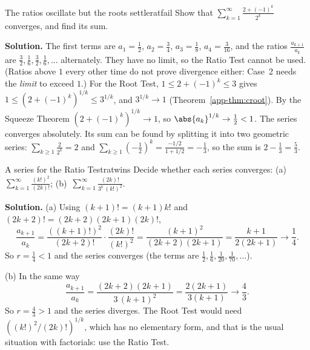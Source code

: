 \documentclass[11pt]{article}
\begin{document}
\begin{exmp}{The ratios oscillate but the roots settle}{ratfail}
Show that $\displaystyle\sum_{k=1}^\infty\frac{2+(-1)^k}{2^k}$ converges, and find its sum.

\textbf{Solution.} The first terms are $a_1=\frac12$, $a_2=\frac34$, $a_3=\frac18$, $a_4=\frac3{16}$, and the ratios $\frac{a_{k+1}}{a_k}$ are $\frac32,\frac16,\frac32,\frac16,\dots$ alternately. They have no limit, so the Ratio Test cannot be used. (Ratios above $1$ every other time do not prove divergence either: Case~2 needs the \emph{limit} to exceed $1$.)
For the Root Test, $1\le2+(-1)^k\le3$ gives $1\le\left(2+(-1)^k\right)^{1/k}\le3^{1/k}$, and $3^{1/k}\to1$ (Theorem~\ref{app-thm:croot}). By the Squeeze Theorem $\left(2+(-1)^k\right)^{1/k}\to1$, so $\abs{a_k}^{1/k}\to\frac12<1$. The series converges absolutely. Its sum can be found by splitting it into two geometric series: $\sum_{k\ge1}\frac2{2^k}=2$ and $\sum_{k\ge1}\left(-\frac12\right)^k=\frac{-1/2}{1+1/2}=-\frac13$, so the sum is $2-\frac13=\frac53$.
\end{exmp}

\begin{exmp}{A series for the Ratio Test}{ratwins}
Decide whether each series converges: (a)~$\displaystyle\sum_{k=1}^\infty\frac{(k!)^2}{(2k)!}$; \quad (b)~$\displaystyle\sum_{k=1}^\infty\frac{(2k)!}{3^k\,(k!)^2}$.

\textbf{Solution.} (a) Using $(k+1)!=(k+1)k!$ and $(2k+2)!=(2k+2)(2k+1)(2k)!$,
\[
\frac{a_{k+1}}{a_k}=\frac{\left((k+1)!\right)^2}{(2k+2)!}\cdot\frac{(2k)!}{(k!)^2}=\frac{(k+1)^2}{(2k+2)(2k+1)}=\frac{k+1}{2(2k+1)}\to\frac14 .
\]
So $r=\frac14<1$ and the series converges (the terms are $\frac12,\frac16,\frac1{20},\frac1{70},\dots$).

(b) In the same way
\[
\frac{a_{k+1}}{a_k}=\frac{(2k+2)(2k+1)}{3\,(k+1)^2}=\frac{2(2k+1)}{3(k+1)}\to\frac43 .
\]
So $r=\frac43>1$ and the series diverges. The Root Test would need $\left((k!)^2/(2k)!\right)^{1/k}$, which has no elementary form, and that is the usual situation with factorials: use the Ratio Test.
\end{exmp}
\end{document}

